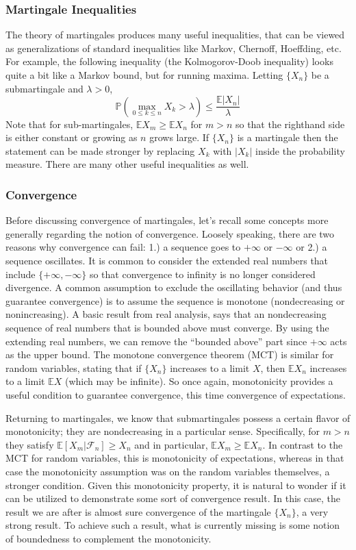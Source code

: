 \documentclass[12pt]{article}
\newcommand*{\abs}[1]{\left\lvert#1\right\rvert}
\newcommand{\E}{\mathbb{E}}
\newcommand{\Prob}{\mathbb{P}}
\begin{document}
\subsubsection{Martingale Inequalities}
The theory of martingales produces many useful inequalities, that can be viewed as generalizations of standard inequalities like Markov, Chernoff, Hoeffding, etc. 
For example, the following inequality (the Kolmogorov-Doob inequality) looks quite a bit like a Markov bound, but for running maxima. Letting $\{X_n\}$ be a 
submartingale and $\lambda > 0$, 
\[\Prob(\max_{0 \leq k \leq n} X_k > \lambda) \leq \frac{\E \abs{X_n}}{\lambda}\]
Note that for sub-martingales, $\E X_m \geq \E X_n$ for $m > n$ so that the righthand side is either constant or growing as $n$ grows large. If $\{X_n\}$ is a
martingale then the statement can be made stronger by replacing $X_k$ with $\abs{X_k}$ inside the probability measure. There are many other useful inequalities as well. 

\subsubsection{Convergence}
Before discussing convergence of martingales, let's recall some concepts more generally regarding the notion of convergence. Loosely speaking, there are two reasons why 
convergence can fail: 1.) a sequence goes to $+\infty$ or $-\infty$ or 2.) a sequence oscillates. It is common to consider the extended real numbers that include 
$\{+\infty, -\infty\}$ so that convergence to infinity is no longer considered divergence. A common assumption to exclude the oscillating behavior (and thus guarantee convergence)
is to assume the sequence is monotone (nondecreasing or nonincreasing). A basic result from real analysis, says that an nondecreasing sequence of real numbers 
that is bounded above must converge. By using the extending real numbers, we can remove the ``bounded above'' part since $+\infty$ acts as the upper bound. The monotone 
convergence theorem (MCT) is similar for random variables, stating that if $\{X_n\}$ increases to a limit $X$, then $\E X_n$ increases to a limit $\E X$ (which may be infinite). 
So once again, monotonicity provides a useful condition to guarantee convergence, this time convergence of expectations. 

Returning to martingales, we know that submartingales possess a certain flavor of monotonicity; they are nondecreasing in a particular sense. Specifically, 
for $m > n$ they satisfy $\E[X_m | \mathcal{F}_n] \geq X_n$ and in particular, $\E X_m \geq \E X_n$. In contrast to the MCT for random variables, this is monotonicity 
of expectations, whereas in that case the monotonicity assumption was on the random variables themselves, a stronger condition. Given this monotonicity property, it is 
natural to wonder if it can be utilized to demonstrate some sort of convergence result. In this case, the result we are after is almost sure convergence of the martingale 
$\{X_n\}$, a very strong result. To achieve such a result, what is currently missing is some notion of boundedness to complement the monotonicity. 
\end{document}

